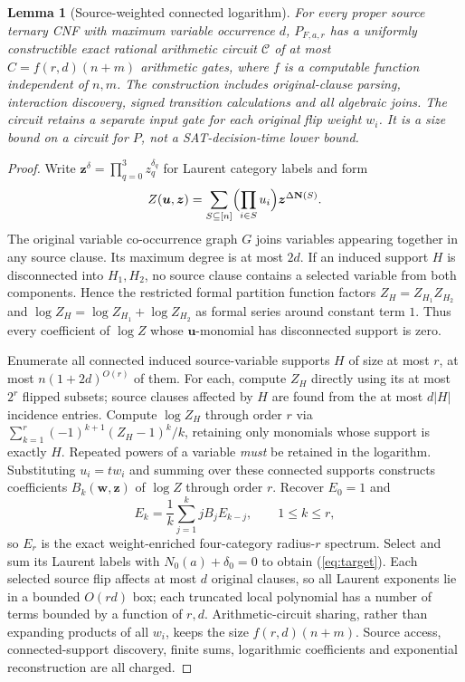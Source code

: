 \documentclass[11pt]{article}
\newtheorem{lemma}{Lemma}
\newcommand{\NN}{\mathbf N}
\newcommand{\zz}{\boldsymbol z}
\begin{document}
\begin{lemma}[Source-weighted connected logarithm]\label{lem:circuit}
For every proper source ternary CNF with maximum variable occurrence $d$, $P_{F,a,r}$ has a uniformly constructible exact rational arithmetic circuit $\mathcal C$ of at most $C=f(r,d)(n+m)$ arithmetic gates, where $f$ is a computable function independent of $n,m$. The construction includes original-clause parsing, interaction discovery, signed transition calculations and all algebraic joins. The circuit retains a separate input gate for each original flip weight $w_i$. It is a size bound on a circuit for $P$, not a SAT-decision-time lower bound.
\end{lemma}
\begin{proof}
Write $\zz^\delta=\prod_{q=0}^3z_q^{\delta_q}$ for Laurent category labels and form
\[Z(\boldsymbol u,\zz)=\sum_{S\subseteq[n]}\Bigl(\prod_{i\in S}u_i\Bigr)\zz^{\Delta\NN(S)}.\]
The original variable co-occurrence graph $G$ joins variables appearing together in any source clause. Its maximum degree is at most $2d$. If an induced support $H$ is disconnected into $H_1,H_2$, no source clause contains a selected variable from both components. Hence the restricted formal partition function factors $Z_H=Z_{H_1}Z_{H_2}$ and $\log Z_H=\log Z_{H_1}+\log Z_{H_2}$ as formal series around constant term $1$. Thus every coefficient of $\log Z$ whose $\boldsymbol u$-monomial has disconnected support is zero.

Enumerate all connected induced source-variable supports $H$ of size at most $r$, at most $n(1+2d)^{O(r)}$ of them. For each, compute $Z_H$ directly using its at most $2^r$ flipped subsets; source clauses affected by $H$ are found from the at most $d|H|$ incidence entries. Compute $\log Z_H$ through order $r$ via $\sum_{k=1}^r(-1)^{k+1}(Z_H-1)^k/k$, retaining only monomials whose support is exactly $H$. Repeated powers of a variable \emph{must} be retained in the logarithm. Substituting $u_i=t w_i$ and summing over these connected supports constructs coefficients $B_k(\boldsymbol w,\zz)$ of $\log Z$ through order $r$. Recover $E_0=1$ and
\[ E_k=\frac1k\sum_{j=1}^k j B_j E_{k-j},\qquad 1\le k\le r,\]
so $E_r$ is the exact weight-enriched four-category radius-$r$ spectrum. Select and sum its Laurent labels with $N_0(a)+\delta_0=0$ to obtain (\ref{eq:target}). Each selected source flip affects at most $d$ original clauses, so all Laurent exponents lie in a bounded $O(rd)$ box; each truncated local polynomial has a number of terms bounded by a function of $r,d$. Arithmetic-circuit sharing, rather than expanding products of all $w_i$, keeps the size $f(r,d)(n+m)$. Source access, connected-support discovery, finite sums, logarithmic coefficients and exponential reconstruction are all charged.\end{proof}
\end{document}
